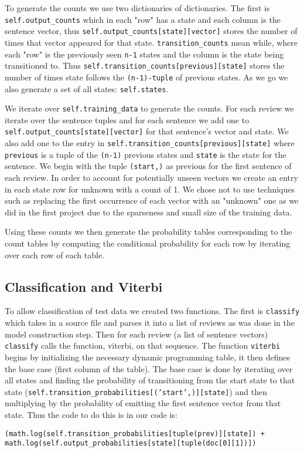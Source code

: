 \documentclass{article}
\begin{document}
To generate the counts we use two dictionaries of dictionaries. The first is \texttt{self.output\_counts} which in each "row" has a state and each column is the sentence vector, thus \texttt{self.output\_counts[state][vector]} stores the number of times that vector appeared for that state. \texttt{transition\_counts} mean while, where each "row" is the previously seen \texttt{n-1} states and the column is the state being transitioned to. Thus \texttt{self.transition\_counts[previous][state]} stores the number of times state follows the \texttt{(n-1)-tuple} of previous states. As we go we also generate a set of all states: \texttt{self.states}.

We iterate over \texttt{self.training\_data} to generate the counts. For each review we iterate over the sentence tuples and for each sentence we add one to \texttt{self.output\_counts[state][vector]} for that sentence's vector and state. We also add one to the entry in  \texttt{self.transition\_counts[previous][state]} where \texttt{previous} is a tuple of the \texttt{(n-1)} previous states and \texttt{state} is the state for the sentence. We begin with the tuple \texttt{(start,)} as previous for the first sentence of each review. In order to account for potentially unseen vectors we create an entry in each state row for unknown with a count of 1. We chose not to use techniques such as replacing the first occurrence of each vector with an "unknown" one as we did in the first project due to the sparseness and small size of the training data. 

Using these counts we then generate the probability tables corresponding to the count tables by computing the conditional probability for each row by iterating over each row of each table.
 
\subsection{Classification and Viterbi}

To allow classification of test data we created two functions. The first is \texttt{classify} which takes in a source file and parses it into a list of reviews as was done in the model construction step. Then for each review (a list of sentence vectors) \texttt{classify} calls the function, viterbi, on that sequence. The function \texttt{viterbi} begins by initializing the necessary dynamic programming table, it then defines the base case (first column of the table). The base case is done by iterating over all states and finding the probability of transitioning from the start state to that state (\texttt{self.transition\_probabilities[('start',)][state]}) and then multiplying by the probability of emitting the first sentence vector from that state. Thus the code to do this is in our code is:
\begin{verbatim}
(math.log(self.transition_probabilities[tuple(prev)][state]) + math.log(self.output_probabilities[state][tuple(doc[0][1])])
\end{verbatim}
\end{document}
